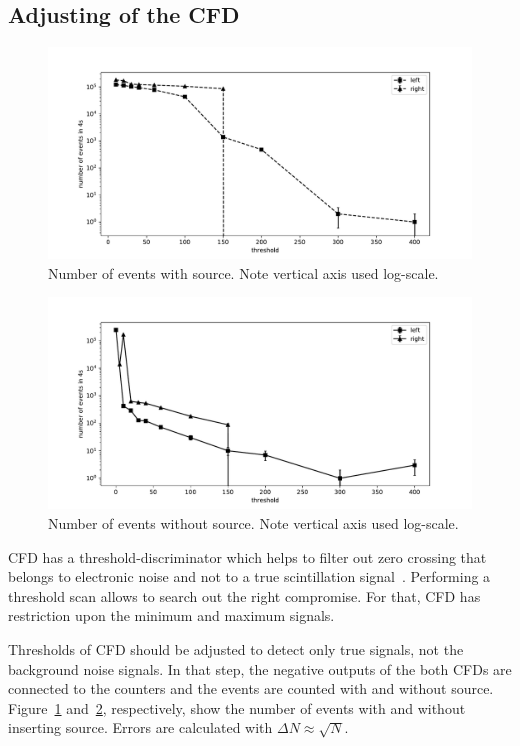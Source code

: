 \subsection{Adjusting of the CFD}
\begin{figure}[H]
	\centering
	\includegraphics[width=0.8\linewidth]{./figs/cfd.pdf}
	\caption{Number of events with source. Note vertical axis used log-scale.}%
	\label{fig:Cfd1}
\end{figure}
\begin{figure}[ht]
	\centering
	\includegraphics[width=0.8\linewidth]{./figs/cfd2.pdf}
	\caption{Number of events without source. Note vertical axis used log-scale.}%
	\label{fig:Cfd2}
\end{figure}

CFD has a threshold-discriminator which helps to filter out zero crossing that belongs to electronic noise and not to a true scintillation signal~\cite{descr}. Performing a threshold scan allows to search out the right compromise. For that, CFD has restriction upon the minimum and maximum signals.  

Thresholds of CFD should be adjusted to detect only true signals, not the background noise signals. In that step, the negative outputs of the both CFDs are connected to the counters and the events are counted with and without source. Figure~\ref{fig:Cfd1} and~\ref{fig:Cfd2}, respectively, show the number of events with and without inserting source. Errors are calculated with $\Delta N \approx \sqrt{N}$.

